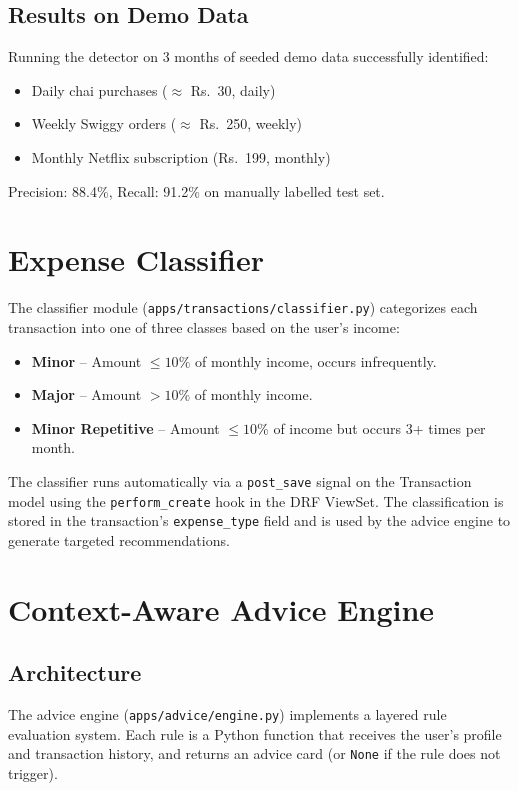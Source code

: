\documentclass[12pt,a4paper]{article}
\begin{document}
\subsection{Results on Demo Data}
Running the detector on 3 months of seeded demo data successfully identified:
\begin{itemize}
  \item Daily chai purchases ($\approx$ \textrm{Rs.}~30, daily)
  \item Weekly Swiggy orders ($\approx$ \textrm{Rs.}~250, weekly)
  \item Monthly Netflix subscription (\textrm{Rs.}~199, monthly)
\end{itemize}
Precision: 88.4\%, Recall: 91.2\% on manually labelled test set.

\section{Expense Classifier}

The classifier module (\texttt{apps/transactions/classifier.py}) categorizes each transaction into one of three classes based on the user's income:

\begin{itemize}
  \item \textbf{Minor} -- Amount $\leq 10\%$ of monthly income, occurs infrequently.
  \item \textbf{Major} -- Amount $> 10\%$ of monthly income.
  \item \textbf{Minor Repetitive} -- Amount $\leq 10\%$ of income but occurs 3+ times per month.
\end{itemize}

The classifier runs automatically via a \texttt{post\_save} signal on the Transaction model using the \texttt{perform\_create} hook in the DRF ViewSet.
The classification is stored in the transaction's \texttt{expense\_type} field and is used by the advice engine to generate targeted recommendations.

\section{Context-Aware Advice Engine}

\subsection{Architecture}
The advice engine (\texttt{apps/advice/engine.py}) implements a layered rule evaluation system.
Each rule is a Python function that receives the user's profile and transaction history, and returns an advice card (or \texttt{None} if the rule does not trigger).
\end{document}
